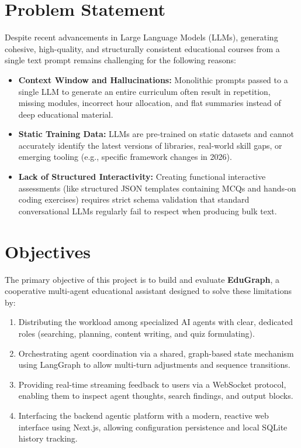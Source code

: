 \documentclass[12pt,a4paper]{report}
\begin{document}
\section{Problem Statement}
Despite recent advancements in Large Language Models (LLMs), generating cohesive, high-quality, and structurally consistent educational courses from a single text prompt remains challenging for the following reasons:
\begin{itemize}
    \item \textbf{Context Window and Hallucinations:} Monolithic prompts passed to a single LLM to generate an entire curriculum often result in repetition, missing modules, incorrect hour allocation, and flat summaries instead of deep educational material.
    \item \textbf{Static Training Data:} LLMs are pre-trained on static datasets and cannot accurately identify the latest versions of libraries, real-world skill gaps, or emerging tooling (e.g., specific framework changes in 2026).
    \item \textbf{Lack of Structured Interactivity:} Creating functional interactive assessments (like structured JSON templates containing MCQs and hands-on coding exercises) requires strict schema validation that standard conversational LLMs regularly fail to respect when producing bulk text.
\end{itemize}

\section{Objectives}
The primary objective of this project is to build and evaluate \textbf{EduGraph}, a cooperative multi-agent educational assistant designed to solve these limitations by:
\begin{enumerate}
    \item Distributing the workload among specialized AI agents with clear, dedicated roles (searching, planning, content writing, and quiz formulating).
    \item Orchestrating agent coordination via a shared, graph-based state mechanism using LangGraph to allow multi-turn adjustments and sequence transitions.
    \item Providing real-time streaming feedback to users via a WebSocket protocol, enabling them to inspect agent thoughts, search findings, and output blocks.
    \item Interfacing the backend agentic platform with a modern, reactive web interface using Next.js, allowing configuration persistence and local SQLite history tracking.
\end{enumerate}
\end{document}
